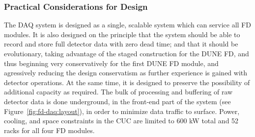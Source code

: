 

\subsubsection{Practical Considerations for Design}

The DAQ system is designed as a single, scalable system which can service
all FD modules. It is also designed on the principle that the system should be
able to record and store full detector data with zero dead time; and
that it should be evolutionary, taking advantage of the staged
construction for the DUNE FD, and thus beginning very conservatively
for the first DUNE FD module, and agressively reducing the design
conservatism as further experience is gained with detector
operations. At the same time, it is designed to preserve the possibility of additional capacity
as required. The bulk of processing and buffering of raw detector data is
done underground, in the front-end part of the system (see Figure~\ref{fig:fd-daq:layout}), in order to
minimize data traffic to surface. Power, cooling, and space
constraints in the CUC are limited to 600 kW total and 52 racks for all four FD
modules.

